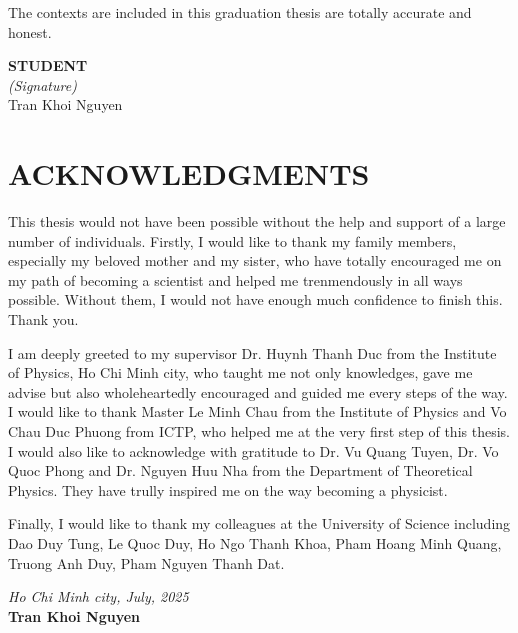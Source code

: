\documentclass{report}
\begin{document}
The contexts are included in this graduation thesis are totally accurate and honest. \\[2cm]



\parbox{0.75in}{\centering \textbf{}} \hfill \parbox{4in}{\centering \textbf{STUDENT}\\
\textit{(Signature)}\\[2cm] Tran Khoi Nguyen}

\chapter*{ACKNOWLEDGMENTS}
This thesis would not have been possible without the help and support of a large number of individuals. Firstly, I would like to thank my family members, especially my beloved mother and my sister, who have totally encouraged me on my path of becoming a scientist and helped me trenmendously in all ways possible. Without them, I would not have enough much confidence to finish this. Thank you.

I am deeply greeted to my supervisor Dr. Huynh Thanh Duc from the Institute of Physics, Ho Chi Minh city, who taught me not only knowledges, gave me advise but also wholeheartedly encouraged and guided me every steps of the way. I would like to thank Master Le Minh Chau from the Institute of Physics and Vo Chau Duc Phuong from ICTP, who helped me at the very first step of this thesis. I would also like to acknowledge with gratitude to Dr. Vu Quang Tuyen, Dr. Vo Quoc Phong and Dr. Nguyen Huu Nha from the Department of Theoretical Physics. They have trully inspired me on the way becoming a physicist.

Finally, I would like to thank my colleagues at the University of Science including Dao Duy Tung, Le Quoc Duy, Ho Ngo Thanh Khoa, Pham Hoang Minh Quang, Truong Anh Duy, Pham Nguyen Thanh Dat. \\ [2cm]


\parbox{0.75in}{\centering \textbf{}} \hfill \parbox{4in}{\centering \textit{Ho Chi Minh city, July, 2025}\\ \textbf{Tran Khoi Nguyen}}


\renewcommand{\contentsname}{TABLE OF CONTENTS}
\tableofcontents
\renewcommand{\listfigurename}{LIST OF FIGURES}
\listoffigures
\newpage
\renewcommand{\listtablename}{LIST OF TABLES}
\listoftables
\newpage
\end{document}
